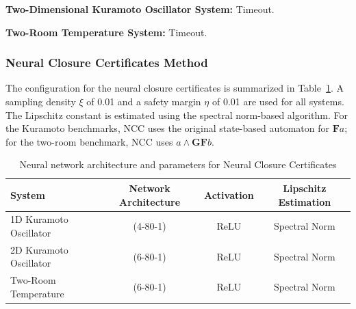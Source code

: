 \textbf{Two-Dimensional Kuramoto Oscillator System:}
Timeout.

\textbf{Two-Room Temperature System:}
Timeout.

\subsubsection{Neural Closure Certificates Method}
The configuration for the neural closure certificates is summarized in Table~\ref{tab:ncc_config}. A sampling density $\xi$ of 0.01 and a safety margin $\eta$ of 0.01 are used for all systems. The Lipschitz constant is estimated using the spectral norm-based algorithm. For the Kuramoto benchmarks, NCC uses the original state-based automaton for $\mathbf{F}a$; for the two-room benchmark, NCC uses $a \land \mathbf{GF} b$.

\begin{table}[h]
\centering
\caption{Neural network architecture and parameters for Neural Closure Certificates}
\label{tab:ncc_config}
\begin{tabular}{lccc}
\hline
\textbf{System} & \textbf{Network Architecture} & \textbf{Activation} & \textbf{Lipschitz Estimation} \\
\hline
1D Kuramoto Oscillator & (4-80-1) & ReLU & Spectral Norm \\
2D Kuramoto Oscillator & (6-80-1) & ReLU & Spectral Norm \\
Two-Room Temperature & (6-80-1) & ReLU & Spectral Norm \\
\hline
\end{tabular}
\end{table}
